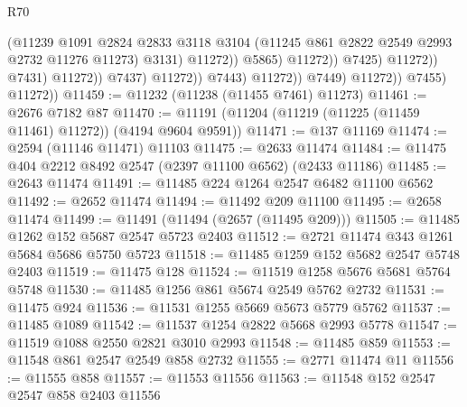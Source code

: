 \begin{lexlean}{R70}
\begin{coremodule}
                                                  (@11239
                                                    @1091
                                                    @2824
                                                    @2833
                                                    @3118
                                                    @3104
                                                    (@11245
                                                      @861
                                                      @2822
                                                      @2549
                                                      @2993
                                                      @2732
                                                      @11276
                                                      @11273)
                                                    @3131)
                                                  @11272))
                                              @5865)
                                            @11272))
                                        @7425)
                                      @11272))
                                  @7431)
                                @11272))
                            @7437)
                          @11272))
                      @7443)
                    @11272))
                @7449)
              @11272))
          @7455)
        @11272))
@11459 := @11232 (@11238 (@11455 @7461) @11273)
@11461 := @2676 @7182 @87
@11470 := @11191 (@11204 (@11219 (@11225 (@11459 @11461) @11272)) (@4194 @9604 @9591))
@11471 := @137 @11169
@11474 := @2594 (@11146 @11471) @11103
@11475 := @2633 @11474
@11484 := @11475 @404 @2212 @8492 @2547 (@2397 @11100 @6562) (@2433 @11186)
@11485 := @2643 @11474
@11491 := @11485 @224 @1264 @2547 @6482 @11100 @6562
@11492 := @2652 @11474
@11494 := @11492 @209 @11100
@11495 := @2658 @11474
@11499 := @11491 (@11494 (@2657 (@11495 @209)))
@11505 := @11485 @1262 @152 @5687 @2547 @5723 @2403
@11512 := @2721 @11474 @343 @1261 @5684 @5686 @5750 @5723
@11518 := @11485 @1259 @152 @5682 @2547 @5748 @2403
@11519 := @11475 @128
@11524 := @11519 @1258 @5676 @5681 @5764 @5748
@11530 := @11485 @1256 @861 @5674 @2549 @5762 @2732
@11531 := @11475 @924
@11536 := @11531 @1255 @5669 @5673 @5779 @5762
@11537 := @11485 @1089
@11542 := @11537 @1254 @2822 @5668 @2993 @5778
@11547 := @11519 @1088 @2550 @2821 @3010 @2993
@11548 := @11485 @859
@11553 := @11548 @861 @2547 @2549 @858 @2732
@11555 := @2771 @11474 @11
@11556 := @11555 @858
@11557 := @11553 @11556
@11563 := @11548 @152 @2547 @2547 @858 @2403 @11556

\end{coremodule}
\end{lexlean}

